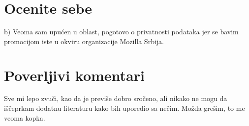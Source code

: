 \documentclass[a4paper]{article}
\begin{document}
\section{Ocenite sebe}
b) Veoma sam upućen u oblast, pogotovo o privatnosti podataka jer se bavim promocijom iste u okviru organizacije Mozilla Srbija.


\section{Poverljivi komentari}
Sve mi lepo zvuči, kao da je previše dobro sročeno, ali nikako ne mogu da iščeprkam dodatnu literaturu kako bih uporedio sa nečim. Možda grešim, to me veoma kopka.
\end{document}
